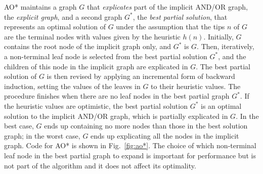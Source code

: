 \documentclass[letterpaper]{article}
\begin{document}
AO* maintains a graph $G$ that \emph{explicates} part of the implicit AND/OR
graph, the \emph{explicit graph}, and a second graph $G^*$, the \emph{best
partial solution},  that represents an optimal solution of $G$
under the assumption that the tips $n$ of $G$ are the terminal nodes
with values given by the heuristic $h(n)$.
Initially, $G$ contains the root node of the implicit graph only, and
$G^*$ is  $G$. Then, iteratively, a non-terminal leaf node is selected
from the best partial solution $G^*$,  and the children of this node in
the implicit graph are explicated in $G$. The best partial solution  of $G$
is then revised by applying an incremental form of  backward induction,
setting the values of the leaves in $G$ to their heuristic values.
The procedure finishes when there are no leaf nodes in the best partial graph $G^*$.
If the heuristic values are optimistic, the best partial solution $G^*$ is an
optimal solution to the implicit AND/OR graph, which is partially explicated in $G$.
In the best case, $G$  ends up containing no more nodes than those in the
best solution graph; in the worst case, $G$  ends up explicating all the
nodes in the implicit graph. Code for AO* is shown in Fig.~\ref{fig:ao*}.
The choice of which non-terminal leaf node in the best partial graph to expand is
important for performance  but is not part of the algorithm and it
does not affect its optimality.
\end{document}
